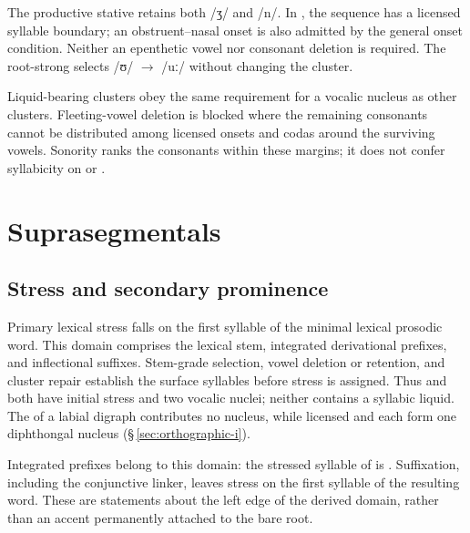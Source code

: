 The productive stative  retains both /ʒ/ and /n/. In
, the sequence has a licensed
syllable boundary; an obstruent--nasal onset is also admitted by the general
onset condition. Neither an epenthetic vowel nor consonant deletion is
required. The root-strong 
selects /ʊ/ $\rightarrow$ /uː/ without changing the cluster.

Liquid-bearing clusters obey the same requirement for a vocalic nucleus as
other clusters. Fleeting-vowel deletion is blocked where the remaining consonants
cannot be distributed among licensed onsets and codas around the surviving
vowels. Sonority ranks the consonants within these margins; it does not confer
syllabicity on  or .


\section{Suprasegmentals}\label{sec:suprasegmentals}

\subsection{Stress and secondary prominence}\label{sec:stress}\label{sec:secondary-stress}

Primary lexical stress falls on the first syllable of the minimal lexical
prosodic word. This domain comprises the lexical stem, integrated derivational
prefixes, and inflectional suffixes. Stem-grade selection,
vowel deletion or retention, and cluster repair establish the surface syllables
before stress is assigned. Thus  and  both have initial
stress and two vocalic nuclei; neither contains a syllabic liquid. The
 of a labial digraph contributes no nucleus, while licensed  and  each form one
diphthongal nucleus (§\,\ref{sec:orthographic-i}).

Integrated prefixes belong to this domain: the stressed syllable of
 is . Suffixation, including the conjunctive linker,
leaves stress on the first syllable of the resulting word. These are statements
about the left edge of the derived domain, rather than an accent permanently
attached to the bare root.

